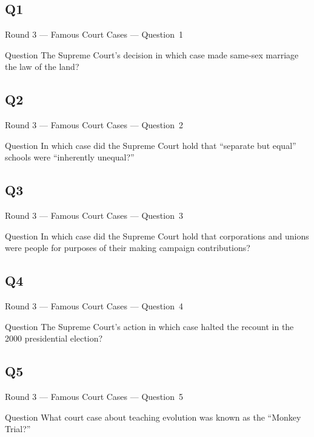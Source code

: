 \documentclass[11pt]{beamer}
\begin{document}
\subsection*{Q1}
\begin{frame}[t]{Round 3 --- Famous Court Cases --- \mbox{Question 1}}
\vspace{-0.5em}
\begin{block}{Question}
The Supreme Court's decision in which case made same-sex marriage the law of the land?
\end{block}
\end{frame}
\subsection*{Q2}
\begin{frame}[t]{Round 3 --- Famous Court Cases --- \mbox{Question 2}}
\vspace{-0.5em}
\begin{block}{Question}
In which case did the Supreme Court hold that ``separate but equal'' schools were ``inherently unequal?''
\end{block}
\end{frame}
\subsection*{Q3}
\begin{frame}[t]{Round 3 --- Famous Court Cases --- \mbox{Question 3}}
\vspace{-0.5em}
\begin{block}{Question}
In which case did the Supreme Court hold that corporations and unions were people for purposes of their making campaign contributions?
\end{block}
\end{frame}
\subsection*{Q4}
\begin{frame}[t]{Round 3 --- Famous Court Cases --- \mbox{Question 4}}
\vspace{-0.5em}
\begin{block}{Question}
The Supreme Court's action in which case halted the recount in the 2000 presidential election?
\end{block}
\end{frame}
\subsection*{Q5}
\begin{frame}[t]{Round 3 --- Famous Court Cases --- \mbox{Question 5}}
\vspace{-0.5em}
\begin{block}{Question}
What court case about teaching evolution was known as the ``Monkey Trial?''
\end{block}
\end{frame}
\end{document}
